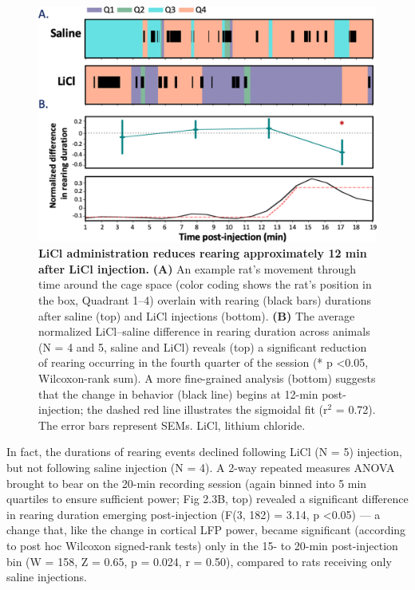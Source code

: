 \begin{refsection}
\begin{figure}
\includegraphics[width=\linewidth]{stone_2022_figs/journal.pbio.3001537.g003.png} 
\caption{\textbf{LiCl administration reduces rearing approximately 12 min after LiCl injection.} \textbf{(A)} An example rat’s movement through time around the cage space (color coding shows the rat’s position in the box, Quadrant 1–4) overlain with rearing (black bars) durations after saline (top) and LiCl injections (bottom). \textbf{(B)} The average normalized LiCl–saline difference in rearing duration across animals (N = 4 and 5, saline and LiCl) reveals (top) a significant reduction of rearing occurring in the fourth quarter of the session (* p \textless 0.05, Wilcoxon-rank sum). A more fine-grained analysis (bottom) suggests that the change in behavior (black line) begins at 12-min post-injection; the dashed red line illustrates the sigmoidal fit (r$^2$ = 0.72). The error bars represent SEMs. LiCl, lithium chloride.
}
\label{fig:wrapfig}
\end{figure}



In fact, the durations of rearing events declined following LiCl (N = 5) injection, but not following saline injection (N = 4). A 2-way repeated measures ANOVA brought to bear on the 20-min recording session (again binned into 5 min quartiles to ensure sufficient power; Fig 2.3B, top) revealed a significant difference in rearing duration emerging post-injection (F(3, 182) = 3.14, p \textless 0.05) --- a change that, like the change in cortical LFP power, became significant (according to post hoc Wilcoxon signed-rank tests) only in the 15- to 20-min post-injection bin (W = 158, Z = 0.65, p = 0.024, r = 0.50), compared to rats receiving only saline injections.


\end{refsection}
